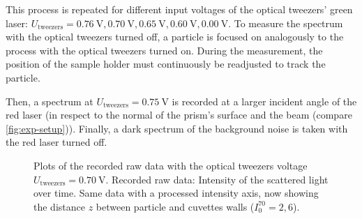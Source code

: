 \documentclass[../bericht.tex]{subfiles}
\begin{document}
      This process is repeated for different input voltages of the optical tweezers' green laser: $U_\mathrm{tweezers}=\SI{0,76}{\volt},\SI{0,70}{\volt},\SI{0,65}{\volt},\SI{0,60}{\volt},\SI{0,00}{\volt}$. To measure the spectrum with the optical tweezers turned off, a particle is focused on analogously to the process with the optical tweezers turned on. During the measurement, the position of the sample holder must continuously be readjusted to track the particle.

      Then, a spectrum at $U_\mathrm{tweezers}=\SI{0,75}{\volt}$ is recorded at a larger incident angle of the red laser (in respect to the normal of the prism's surface and the beam (compare \cref{fig:exp-setup})). Finally, a dark spectrum of the background noise is taken with the red laser turned off.

      \begin{figure}[tb]
        \centering
        \hfill
        \caption{Plots of the recorded raw data with the optical tweezers voltage $U_\mathrm{tweezers}=\SI{0,70}{\volt}$. \protect{} Recorded raw data: Intensity of the scattered light over time. \protect{} Same data with a processed intensity axis, now showing the distance $z$ between particle and cuvettes walls ($I_0^{70}=2,6$).}
        \label{fig:70-i-t-z-t}
      \end{figure}
\end{document}
